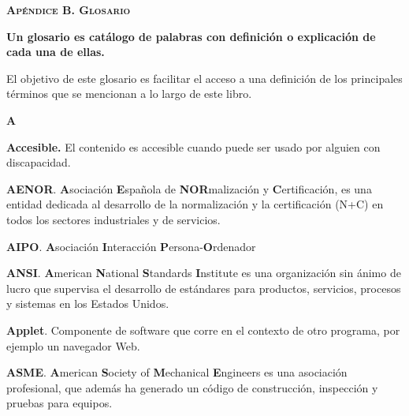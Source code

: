 \documentclass[a4paper]{article}
\newcommand\textstyleProyectoNegrita[1]{\textbf{#1}}
\begin{document}
\clearpage\setcounter{page}{1}\pagestyle{Convertirxvi}
{\raggedleft\bfseries\scshape
Apéndice B. Glosario
\par}

\clearpage
\bigskip

\clearpage\setcounter{page}{1}\pagestyle{Convertirxvii}

\bigskip


\bigskip


\bigskip


\bigskip

{\bfseries
Un glosario es catálogo de palabras con definición o explicación de cada una de ellas.}


\bigskip

{
{El objetivo de este glosario es facilitar el acceso a una definición de los principales términos que }{se mencionan a lo largo de este libro.}}

{\bfseries
A}

{
\textstyleProyectoNegrita{Accesible. }El contenido es accesible cuando puede ser usado por alguien con discapacidad.}

{
\textstyleProyectoNegrita{{AENOR}}{. }\textstyleProyectoNegrita{{A}}{sociación }\textstyleProyectoNegrita{{E}}{spañola de }\textstyleProyectoNegrita{{NOR}}{malización y }\textstyleProyectoNegrita{{C}}{ertificación, es una entidad dedicada al desarrollo de la normalización y la certificación (N+C) en todos los sectores industriales y de servicios.}}

{
\textstyleProyectoNegrita{{AIPO}}{. }\textstyleProyectoNegrita{{A}}{sociación }\textstyleProyectoNegrita{{I}}{nteracción }\textstyleProyectoNegrita{{P}}{ersona-}\textstyleProyectoNegrita{{O}}{rdenador}}

{
\textstyleProyectoNegrita{{ANSI}}{. }\textstyleProyectoNegrita{{A}}{merican }\textstyleProyectoNegrita{{N}}{ational }\textstyleProyectoNegrita{{S}}{tandards }\textstyleProyectoNegrita{{I}}{nstitute es una organización sin ánimo de lucro que supervisa el desarrollo de estándares para productos, servicios, procesos y sistemas en los Estados Unidos.}}

{
\textstyleProyectoNegrita{{Applet}}{. Componente de software que corre en el contexto de otro programa, por ejemplo un navegador Web.}}

{
\textstyleProyectoNegrita{{ASME}}{. }\textstyleProyectoNegrita{{A}}{merican }\textstyleProyectoNegrita{{S}}{ociety of }\textstyleProyectoNegrita{{M}}{echanical }\textstyleProyectoNegrita{{E}}{ngineers es una asociación profesional, que además ha generado un código de construcción, inspección y pruebas para equipos.}}
\end{document}
